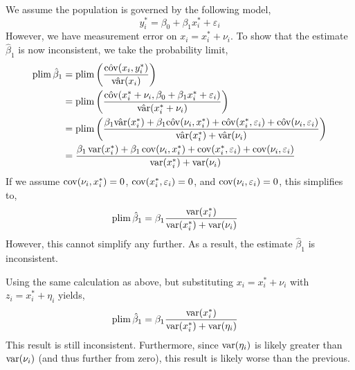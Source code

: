 \documentclass[12pt,twoside]{article}
\begin{document}
\begin{problems}
\begin{problemparts}
We assume the population is governed by the following model,
$$ y_i^* = \beta_0 + \beta_1 x_i^* + \varepsilon_i $$
However, we have measurement error on $x_i = x_i^* + \nu_i$. To show that the
estimate $\hat{\beta}_1$ is now inconsistent, we take the probability limit,
\begin{align*}
    \operatorname{plim} \hat{\beta}_1 &= \operatorname{plim} \left(\frac{\hat{\operatorname{cov}}(x_i,
    y_i^*)}{\hat{\operatorname{var}}(x_i)}\right) \\
    &= \operatorname{plim} \left(\frac{\hat{\operatorname{cov}}(x_i^* + \nu_i, \beta_0 + \beta_1 x_i^* +
    \varepsilon_i)}{\hat{\operatorname{var}}(x_i^* + \nu_i)}\right) \\
    &= \operatorname{plim} \left(\frac{\beta_1 \hat{\operatorname{var}}(x_i^*) + \beta_1
    \hat{\operatorname{cov}}(\nu_i, x_i^*) + \hat{\operatorname{cov}}(x_i^*, \varepsilon_i) +
    \hat{\operatorname{cov}}(\nu_i, \varepsilon_i)}{\hat{\operatorname{var}}(x_i^*) +
    \hat{\operatorname{var}}(\nu_i)}\right) \\
    &= \frac{\beta_1 \operatorname{var}(x_i^*) + \beta_1 \operatorname{cov}(\nu_i, x_i^*) + \operatorname{cov}(x_i^*,
    \varepsilon_i) + \operatorname{cov}(\nu_i, \varepsilon_i)}{\operatorname{var}(x_i^*) +
    \operatorname{var}(\nu_i)}
\end{align*}
If we assume $\operatorname{cov}(\nu_i, x_i^*) = 0$, $\operatorname{cov}(x_i^*, \varepsilon_i) = 0$, and
$\operatorname{cov}(\nu_i, \varepsilon_i) = 0$, this simplifies to,
\begin{align*}
    \operatorname{plim} \hat{\beta}_1 &= \beta_1 \frac{\operatorname{var}(x_i^*)}{\operatorname{var}(x_i^*) +
    \operatorname{var}(\nu_i)}
\end{align*}
However, this cannot simplify any further. As a result, the estimate
$\hat{\beta}_1$ is inconsistent.

\problempart %

Using the same calculation as above, but substituting $x_i = x_i^* + \nu_i$
with $z_i = x_i^* + \eta_i$ yields,
\begin{align*}
    \operatorname{plim} \hat{\beta}_1 &= \beta_1 \frac{\operatorname{var}(x_i^*)}{\operatorname{var}(x_i^*) +
    \operatorname{var}(\eta_i)}
\end{align*}
This result is still inconsistent. Furthermore, since $\operatorname{var}(\eta_i)$ is
likely greater than $\operatorname{var}(\nu_i)$ (and thus further from zero), this result
is likely worse than the previous.

\problempart %


\end{problemparts}
\end{problems}
\end{document}
